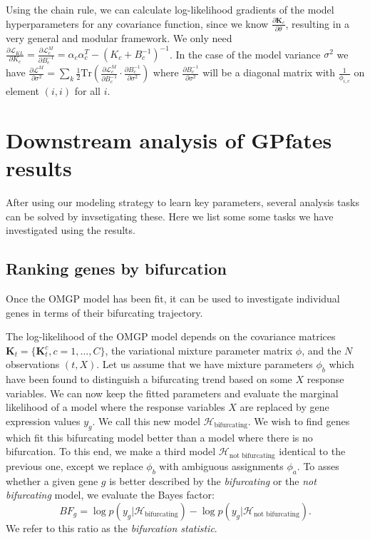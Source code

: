 Using the chain rule, we can calculate log-likelihood gradients of the model hyperparameters for any covariance function, since we know $ \frac{\partial \bm{K}_c}{\partial \mathbb{\theta}} $, resulting in a very general and modular framework. We only need
$ \frac{\partial \mathcal{L}_{KL}}{\partial K_c} =
\frac{\partial \mathcal{L}^{M}_c}{\partial B_c^{-1}} =
\alpha_c \alpha_c^T  - (K_c + B_c^{-1})^{-1} $.
In the case of the model variance $ \sigma^2 $ we have
$ \frac{\partial \mathcal{L}^{M}}{\partial \sigma^2} =
\sum_k \frac{1}{2} \text{Tr} \left( \frac{\partial \mathcal{L}^{M}_c}{\partial B_c^{-1}} \cdot
\frac{\partial B_c^{-1}}{\partial \sigma^2} \right) $
where $ \frac{\partial B_c^{-1}}{\partial \sigma^2} $ will be a diagonal matrix with
$ \frac{1}{\phi_{i, c}} $ on element $ (i, i) $ for all $ i $.

\section{Downstream analysis of GPfates results}

After using our modeling strategy to learn key parameters, several analysis tasks can be solved by invsetigating these. Here we list some some tasks we have investigated using the results.

\subsection{Ranking genes by bifurcation}

Once the OMGP model has been fit, it can be used to investigate individual genes in terms of their bifurcating trajectory.

The log-likelihood of the OMGP model depends on the covariance matrices $ \mathbf{K}_t = \{ \bm{K}^c_t, c=1, \ldots, C\} $, the variational mixture parameter matrix $ \phi $, and the $ N $ observations $ (t, X) $. Let us assume that we have mixture parameters $ \phi_{b} $ which have been found to distinguish a bifurcating trend based on some $ X $ response variables. We can now keep the fitted parameters and evaluate the marginal likelihood of a model where the response variables $ X $ are replaced by gene expression values $ y_g $. We call this new model $ \mathcal{H}_\text{bifurcating} $. We wish to find genes which fit this bifurcating model better than a model where there is no bifurcation. To this end, we make a third model $ \mathcal{H}_\text{not bifurcating} $ identical to the previous one, except we replace $ \phi_{b} $ with ambiguous assignments $ \phi_a $. To asses whether a given gene $ g $ is better described by the \textit{bifurcating} or the \textit{not bifurcating} model, we evaluate the Bayes factor:
$$
BF_{g} = \log p(y_g | \mathcal{H}_\text{bifurcating}) - \log p(y_g | \mathcal{H}_\text{not bifurcating}).
$$
We refer to this ratio as the \textit{bifurcation statistic}.

